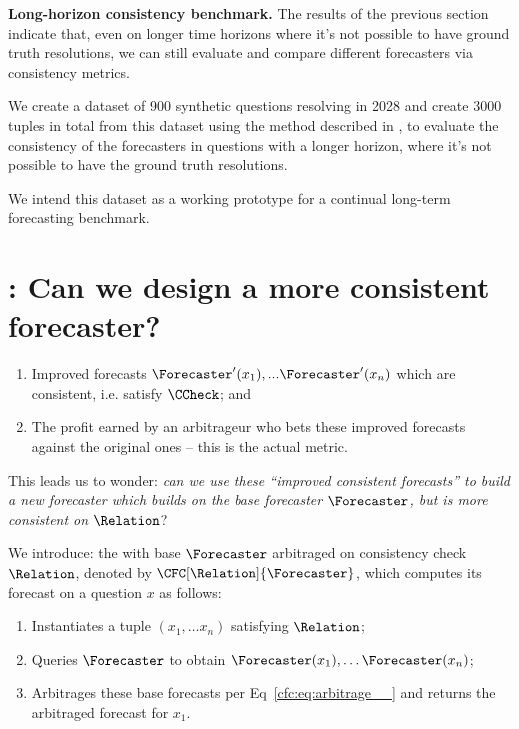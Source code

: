 \textbf{Long-horizon consistency benchmark.}
The results of the previous section indicate that, even on longer time horizons where it's not possible to have ground truth resolutions, we can still evaluate and compare different forecasters via consistency metrics.

We create a dataset of 900 synthetic questions resolving in 2028 and create 3000 tuples in total from this dataset using the method described in , to evaluate the consistency of the forecasters in questions with a longer horizon, where it's not
possible to have the ground truth resolutions.

We intend this dataset as a working prototype for a continual long-term forecasting benchmark.

\section{\CFCaster{}: Can we design a more consistent forecaster?}
\label{cfc:sec:cfcaster}


\begin{enumerate}
    \item Improved forecasts $\Forecaster'(x_1), ... \Forecaster'(x_n)$ which are consistent, i.e. satisfy $\CCheck$; and
    \item The profit earned by an arbitrageur who bets these improved forecasts against the original ones -- this is the actual metric.
\end{enumerate}

This leads us to wonder: \emph{can we use these ``improved consistent forecasts'' to build a new forecaster which builds on the base forecaster $\Forecaster$, but is more consistent on $\Relation$}?

We introduce: the \CFCaster{} with base $\Forecaster$ arbitraged on consistency check $\Relation$, denoted by $\CFC[\Relation]{\Forecaster}$, which computes its forecast on a question $x$ as follows:
\begin{enumerate}
    \item Instantiates a tuple $(x_1,\dots x_n)$ satisfying $\Relation$;
    \item Queries $\Forecaster$ to obtain $\Forecaster(x_1),\dots\Forecaster(x_n)$;
    \item Arbitrages these base forecasts per Eq~\ref{cfc:eq:arbitrage__} and returns the arbitraged forecast for $x_1$.
\end{enumerate}

